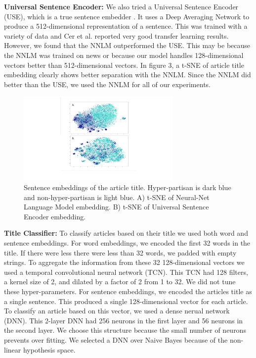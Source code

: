 \documentclass[11pt,a4paper]{article}
\begin{document}
\textbf{Universal Sentence Encoder:} We also tried a Universal Sentence Encoder (USE), which is a true sentence embedder \citep{DBLP:journals/corr/abs-1803-11175}. It uses a Deep Averaging Network to produce a 512-dimensional representation of a sentence. This was trained with a variety of data and Cer et al. reported very good transfer learning results. However, we found that the NNLM outperformed the USE. This may be because the NNLM was trained on news or because our model handles 128-dimensional vectors better than 512-dimensional vectors. In figure 3, a t-SNE of article title embedding clearly shows better separation with the NNLM. Since the NNLM did better than the USE, we used the NNLM for all of our experiments.

\begin{figure}[h]
\caption{Sentence embeddings of the article title. Hyper-partisan is dark blue and non-hyper-partisan is light blue. A) t-SNE of Neural-Net Language Model embedding. B) t-SNE of Universal Sentence Encoder embedding.}
\includegraphics[width=8cm]{images/embedding.pdf}
\end{figure}

\textbf{Title Classifier:} To classify articles based on their title we used both word and sentence embeddings. For word embeddings, we encoded the first 32 words in the title. If there were less there were less than 32 words, we padded with empty strings. To aggregate the information from these 32 128-dimensional vectors we used a temporal convolutional neural network (TCN). This TCN had 128 filters, a kernel size of 2, and dilated by a factor of 2 from 1 to 32. We did not tune these hyper-parameters. For sentence embeddings, we encoded the articles title as a single sentence. This produced a single 128-dimensional vector for each article. To classify an article based on this vector, we used a dense nerual network (DNN). This 2-layer DNN had 256 neurons in the first layer and 56 neurons in the second layer. We choose this structure because the small number of neurons prevents over fitting. We selected a DNN over Naive Bayes because of the non-linear hypothesis space.
\end{document}
